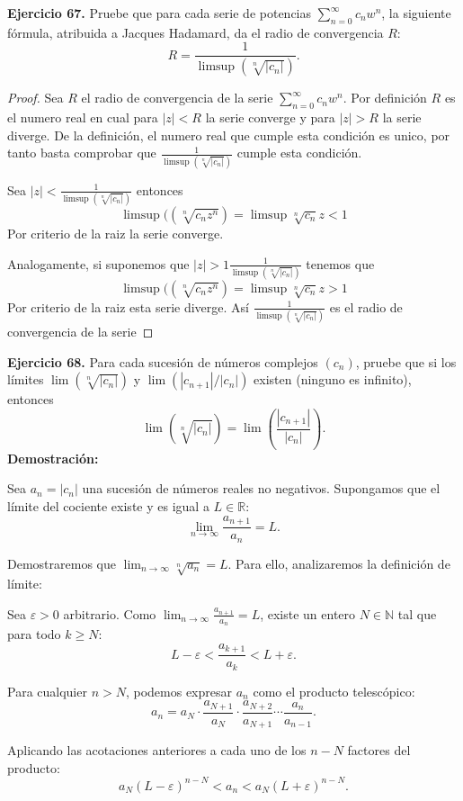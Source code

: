 \documentclass[11pt,a4paper]{article}
\theoremstyle{definition}
\theoremstyle{plain}
\theoremstyle{remark}
\begin{document}
	\noindent \textbf{Ejercicio 67.} Pruebe que para cada serie de potencias $\sum_{n=0}^{\infty} c_n w^n$, la siguiente fórmula, atribuida a Jacques Hadamard, da el radio de convergencia $R$:
	\[
	R = \frac{1}{\limsup (\sqrt[n]{|c_n|})}.
	\]
	
	\begin{proof}
		Sea $R$ el radio de convergencia de la serie $\sum_{n=0}^{\infty} c_n w^n$. Por definición $R$ es el numero real en cual para $|z|<R$ la serie converge y para $|z|>R$ la serie diverge. De la definición, el numero real que cumple esta condición es unico, por tanto basta comprobar que $ \frac{1}{\limsup (\sqrt[n]{|c_n|})}$ cumple esta condición.
		
		Sea $|z|< \frac{1}{\limsup (\sqrt[n]{|c_n|})}$ entonces
		$$\limsup((\sqrt[n]{c_nz^n})= \limsup{\sqrt[n]{c_n}} z<1$$
		Por criterio de la raiz la serie converge.
		
		Analogamente, si suponemos que $|z|>1 \frac{1}{\limsup (\sqrt[n]{|c_n|})}$ tenemos que
		$$\limsup((\sqrt[n]{c_nz^n})= \limsup{\sqrt[n]{c_n}} z>1$$
		Por criterio de la raiz esta serie diverge. Así $\frac{1}{\limsup (\sqrt[n]{|c_n|})}$ es el radio de convergencia de la serie
		
	\end{proof}
	\vspace{1em}
	\noindent \textbf{Ejercicio 68.} Para cada sucesión de números complejos $(c_n)$, pruebe que si los límites $\lim(\sqrt[n]{|c_n|})$ y $\lim(|c_{n+1}| / |c_n|)$ existen (ninguno es infinito), entonces
	\[
	\lim(\sqrt[n]{|c_n|}) = \lim\left(\frac{|c_{n+1}|}{|c_n|}\right).
	\]
	\noindent \textbf{Demostración:}
	
	Sea $a_n = |c_n|$ una sucesión de números reales no negativos. Supongamos que el límite del cociente existe y es igual a $L \in \mathbb{R}$:
	\[
	\lim_{n \to \infty} \frac{a_{n+1}}{a_n} = L.
	\]
	
	Demostraremos que $\lim_{n \to \infty} \sqrt[n]{a_n} = L$. Para ello, analizaremos la definición de límite:
	
	Sea $\varepsilon > 0$ arbitrario. Como $\lim_{n \to \infty} \frac{a_{n+1}}{a_n} = L$, existe un entero $N \in \mathbb{N}$ tal que para todo $k \ge N$:
	\[
	L - \varepsilon < \frac{a_{k+1}}{a_k} < L + \varepsilon.
	\]
	
	Para cualquier $n > N$, podemos expresar $a_n$ como el producto telescópico:
	\[
	a_n = a_N \cdot \frac{a_{N+1}}{a_N} \cdot \frac{a_{N+2}}{a_{N+1}} \cdots \frac{a_n}{a_{n-1}}.
	\]
	
	Aplicando las acotaciones anteriores a cada uno de los $n - N$ factores del producto:
	\[
	a_N (L - \varepsilon)^{n-N} < a_n < a_N (L + \varepsilon)^{n-N}.
	\]
	
\end{document}
